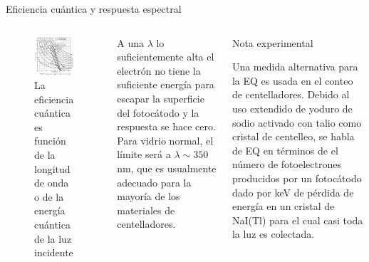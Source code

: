 \documentclass[a4paper,10pt]{beamer}
\begin{document}
\begin{frame}[allowframebreaks]{Eficiencia cuántica y respuesta espectral}
\begin{justify}
  \begin{columns}[c]
  \column{2in}
  \begin{figure}
   \includegraphics[scale=0.28]{fig5}
   \caption{La eficiencia cuántica es función de la longitud de onda
   o de la energía cuántica de la luz incidente}
  \end{figure}
  
  \column{2in}
  \begin{justify}
  \footnotesize{A una $\lambda$ lo suficientemente alta el electrón no tiene la suficiente
  energía para escapar la superficie del fotocátodo y la respuesta se 
  hace cero. Para vidrio normal, el límite será a $\lambda \sim 350$ nm,
  que es usualmente adecuado para la mayoría de los materiales de centelladores.}
  \end{justify}
  
  \begin{exampleblock}{Nota experimental}
   \begin{justify}
   \footnotesize{Una medida alternativa para la EQ es usada en el conteo de 
   centelladores. Debido al uso extendido de yoduro de sodio 
   activado con talio como cristal de centelleo, se habla de EQ 
   en términos de el número de fotoelectrones producidos por un
   fotocátodo dado por keV de pérdida de energía en un cristal
   de NaI(Tl) para el cual casi toda la luz es colectada.}
   \end{justify}
  \end{exampleblock}


\end{columns}
\end{justify}
\end{frame}
\end{document}
